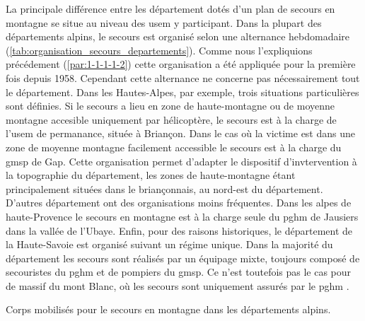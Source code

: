 La principale différence entre les département dotés d'un plan de
secours en montagne se situe au niveau des \ac{usem} y
participant. Dans la plupart des départements alpins, le secours est
organisé selon une alternance hebdomadaire
(\autoref{tab:organisation_secours_departements}). Comme nous
l'expliquions précédement (\ref{par:1-1-1-1-2}) cette organisation a
été appliquée pour la première fois depuis 1958. Cependant cette
alternance ne concerne pas nécessairement tout le département. Dans
les Hautes-Alpes, par exemple, trois situations particulières sont
définies. Si le secours a lieu en zone de haute-montagne ou de moyenne
montagne accesible uniquement par hélicoptère, le secours est à la
charge de l'\ac{usem} de permanance, située à Briançon. Dans le cas où
la victime est dans une zone de moyenne montagne facilement accessible
le secours est à la charge du \ac{gmsp} de Gap. Cette organisation
permet d'adapter le dispositif d'invtervention à la topographie du
département, les zones de haute-montagne étant principalement situées
dans le briançonnais, au nord-est du département. D'autres département
ont des organisations moins fréquentes. Dans les alpes de
haute-Provence le secours en montagne est à la charge seule du
\ac{pghm} de Jausiers dans la vallée de l'Ubaye. Enfin, pour des
raisons historiques, le département de la Haute-Savoie est organisé
suivant un régime unique. Dans la majorité du département les secours
sont réalisés par un équipage mixte, toujours composé de secouristes
du \ac{pghm} et de pompiers du \ac{gmsp}. Ce n'est toutefois pas le
cas pour de massif du mont Blanc, où les secours sont uniquement
assurés par le \ac{pghm} \autocite{Halle2007,Boillot2017}.

\begin{table}
  \centering
  
  \caption{Corps mobilisés pour le secours en montagne dans les
    départements alpins.}
  \label{tab:organisation_secours_departements}
\end{table}

